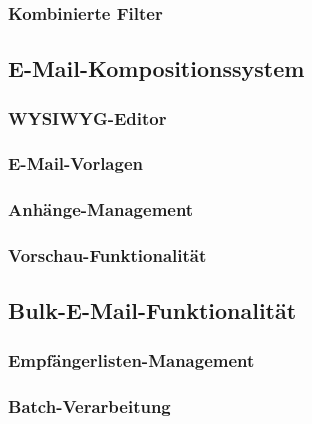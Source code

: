 \documentclass[11pt,a4paper]{article}
\begin{document}
\subsubsection{Kombinierte Filter}

\subsection{E-Mail-Kompositionssystem}

\subsubsection{WYSIWYG-Editor}

\subsubsection{E-Mail-Vorlagen}

\subsubsection{Anhänge-Management}

\subsubsection{Vorschau-Funktionalität}

\subsection{Bulk-E-Mail-Funktionalität}

\subsubsection{Empfängerlisten-Management}

\subsubsection{Batch-Verarbeitung}
\end{document}
